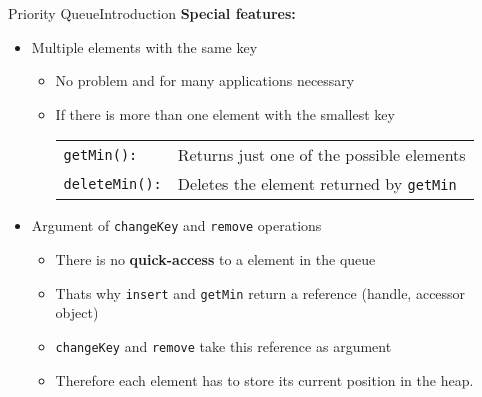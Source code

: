 
\begin{frame}{Priority Queue}{Introduction}
  \textbf{Special features:}
  \begin{itemize}
    \item<2->
      Multiple elements with the same key
      \begin{itemize}
        \item<3->
          No problem and for many applications necessary
        \item<3->
          If there is more than one element with the smallest key
          \begin{tabular}{ll}
            {\color{Mittel-Blau}\texttt{getMin():}} &
            Returns just one of the possible elements\\
            {\color{Mittel-Blau}\texttt{deleteMin():}} &
            Deletes the element returned by
            {\color{Mittel-Blau}\texttt{getMin}}
          \end{tabular}
      \end{itemize}
      \vspace{0.5em}
    \item<4->
      Argument of {\color{Mittel-Blau}\texttt{changeKey}} and
          {\color{Mittel-Blau}\texttt{remove}} operations
      \begin{itemize}
        \item<5->
          There is no \textbf{quick-access} to a element in the queue
        \item<5->
          Thats why {\color{Mittel-Blau}\texttt{insert}} and
          {\color{Mittel-Blau}\texttt{getMin}} return a reference
          (handle, accessor object)
        \item<5->
          {\color{Mittel-Blau}\texttt{changeKey}} and
          {\color{Mittel-Blau}\texttt{remove}} take this reference as argument
        \item<5->
          Therefore each element has to store its current position in the heap.
      \end{itemize}
  \end{itemize}
\end{frame}



